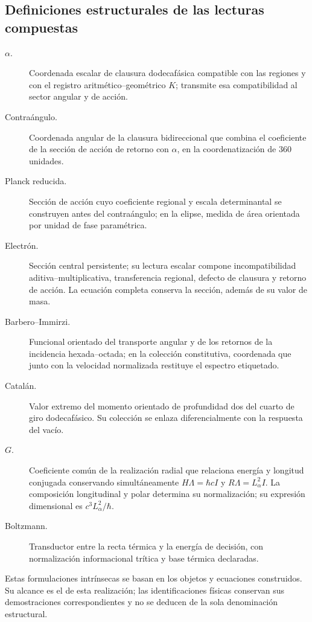 \subsection{Definiciones estructurales de las lecturas compuestas}
\label{md:compos:definiciones}

\begin{description}
 \item[$\alpha$.] Coordenada escalar de clausura dodecafásica compatible con
 las regiones y con el registro aritmético--geométrico $K$; transmite esa
 compatibilidad al sector angular y de acción.
 \item[Contraángulo.] Coordenada angular de la clausura bidireccional que
 combina el coeficiente de la sección de acción de retorno con $\alpha$,
 en la coordenatización de $360$ unidades.
 \item[Planck reducida.] Sección de acción cuyo coeficiente regional y escala
 determinantal se construyen antes del contraángulo; en la elipse, medida de
 área orientada por unidad de fase paramétrica.
 \item[Electrón.] Sección central persistente; su lectura escalar compone
 incompatibilidad aditiva--multiplicativa, transferencia regional, defecto
 de clausura y retorno de acción. La ecuación completa conserva la sección,
 además de su valor de masa.
 \item[Barbero--Immirzi.] Funcional orientado del transporte angular y de los
 retornos de la incidencia hexada--octada; en la colección constitutiva,
 coordenada que junto con la velocidad normalizada restituye el espectro
 etiquetado.
 \item[Catalán.] Valor extremo del momento orientado de profundidad dos del
 cuarto de giro dodecafásico. Su colección se enlaza diferencialmente con la
 respuesta del vacío.
 \item[$G$.] Coeficiente común de la realización radial que relaciona
 energía y longitud conjugada conservando simultáneamente
 $H\Lambda=\hbar cI$ y $R\Lambda=L_\alpha^2I$.
 La composición longitudinal y polar determina su normalización;
 su expresión dimensional es $c^3L_\alpha^2/\hbar$.
 \item[Boltzmann.] Transductor entre la recta térmica y la energía de
 decisión, con normalización informacional trítica y base térmica declaradas.
\end{description}
Estas formulaciones intrínsecas se basan en los objetos y ecuaciones
construidos. Su alcance es el de esta realización; las identificaciones
físicas conservan sus demostraciones correspondientes y no se deducen de
la sola denominación estructural.

